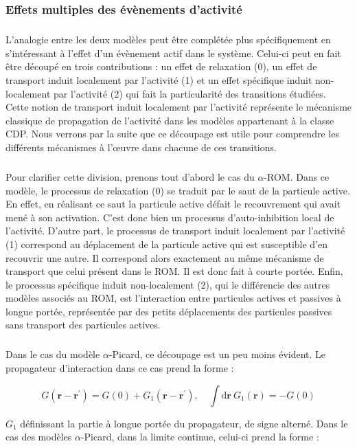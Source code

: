 \subsubsection{Effets multiples des évènements d'activité}

\subparagraph{}L'analogie entre les deux modèles peut être complétée plus spécifiquement en s'intéressant à  l'effet d'un évènement actif dans le système. Celui-ci peut en fait être découpé en trois contributions : un effet de relaxation (0), un effet de transport induit localement par l'activité (1) et un effet spécifique induit non-localement par l'activité (2) qui fait la particularité des transitions étudiées. Cette notion de transport induit localement par l'activité représente le mécanisme classique de propagation de l'activité dans les modèles appartenant à la classe CDP. Nous verrons par la suite que ce découpage est utile pour comprendre les différents mécanismes à l’œuvre dans chacune de ces transitions.

\subparagraph{}Pour clarifier cette division, prenons tout d'abord le cas du $\alpha$-ROM. Dans ce modèle, le processus de relaxation (0) se traduit par le saut de la particule active. En effet, en réalisant ce saut la particule active défait le recouvrement qui avait mené à son activation. C'est donc bien un processus d'auto-inhibition local de l'activité. D'autre part, le processus de transport induit localement par l'activité (1) correspond au déplacement de la particule active qui est susceptible d'en recouvrir une autre. Il correspond alors exactement au même mécanisme de transport que celui présent dans le ROM. Il est donc fait à courte portée. Enfin, le processus spécifique induit non-localement (2), qui le différencie des autres modèles associés au ROM, est l'interaction entre particules actives et passives à longue portée, représentée par des petits déplacements des particules passives sans transport des particules actives. 

\subparagraph{}Dans le cas du modèle $\alpha$-Picard, ce découpage est un peu moins évident. Le propagateur d'interaction dans ce cas prend la forme :

\begin{equation}
	G(\mathbf{r}-\mathbf{r}^\prime) = G(0) + G_1(\mathbf{r}-\mathbf{r}^\prime), \quad \int \mathrm{d}\mathbf{r}~ G_1(\mathbf{r}) = -G(0)
\end{equation}

\noindent $G_1$ définissant la partie à longue portée du propagateur, de signe alterné. Dans le cas des modèles $\alpha$-Picard, dans la limite continue, celui-ci prend la forme :

